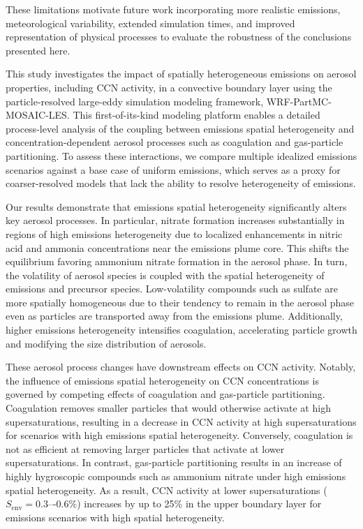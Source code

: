 \documentclass[acp, manuscript]{copernicus}
\begin{document}
These limitations motivate future work incorporating more realistic
emissions, meteorological variability, extended simulation times, and improved representation of physical processes to evaluate the robustness of the conclusions presented here.


\conclusions  %

This study investigates the impact of spatially heterogeneous
emissions on aerosol properties, including CCN activity, in a
convective boundary layer using the particle-resolved large-eddy
simulation modeling framework, WRF-PartMC-MOSAIC-LES. This
first-of-its-kind modeling platform enables a detailed process-level
analysis of the coupling between emissions spatial heterogeneity and
concentration-dependent aerosol processes such as coagulation and
gas-particle partitioning. To assess these interactions, we compare
multiple idealized emissions scenarios against a base case of uniform
emissions, which serves as a proxy for coarser-resolved models that
lack the ability to resolve heterogeneity of emissions.

Our results demonstrate that emissions spatial heterogeneity
significantly alters key aerosol processes. In particular, nitrate
formation increases substantially in regions of high emissions
heterogeneity due to localized enhancements in nitric acid and ammonia
concentrations near the emissions plume core. This shifts the
equilibrium favoring ammonium nitrate formation in the aerosol
phase. In turn, the volatility of aerosol species is coupled with the
spatial heterogeneity of emissions and precursor species.
Low-volatility compounds such as sulfate are more spatially
homogeneous due to their tendency to remain in the aerosol phase even
as particles are transported away from the emissions plume.
Additionally, higher emissions heterogeneity intensifies coagulation,
accelerating particle growth and modifying the size distribution of
aerosols.

These aerosol process changes have downstream effects on CCN
activity. Notably, the influence of emissions spatial heterogeneity on
CCN concentrations is governed by competing effects of coagulation and
gas-particle partitioning. Coagulation removes smaller particles that
would otherwise activate at high supersaturations, resulting in a
decrease in CCN activity at high supersaturations for scenarios with
high emissions spatial heterogeneity. Conversely, coagulation is not
as efficient at removing larger particles that activate at lower
supersaturations. In contrast, gas-particle partitioning results in an
increase of highly hygroscopic compounds such as ammonium nitrate
under high emissions spatial heterogeneity. As a result, CCN activity
at lower supersaturations ($S_{\mathrm{env}} = 0.3\mbox{–-}0.6\%$) increases by up to
25\% in the upper boundary layer for emissions scenarios with high
spatial heterogeneity.
\end{document}
